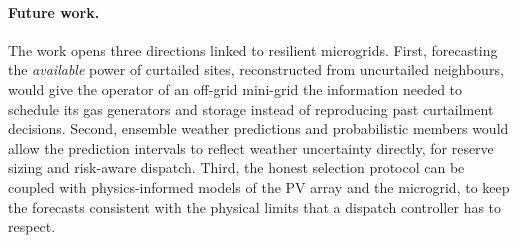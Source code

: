 \paragraph{Future work.}
The work opens three directions linked to resilient microgrids. First, forecasting the
\emph{available} power of curtailed sites, reconstructed from uncurtailed neighbours, would give
the operator of an off-grid mini-grid the information needed to schedule its gas generators and
storage instead of reproducing past curtailment decisions. Second, ensemble weather predictions
and probabilistic members would allow the prediction intervals to reflect weather uncertainty
directly, for reserve sizing and risk-aware dispatch. Third, the honest selection protocol can be
coupled with physics-informed models of the PV array and the microgrid, to keep the forecasts
consistent with the physical limits that a dispatch controller has to respect.
